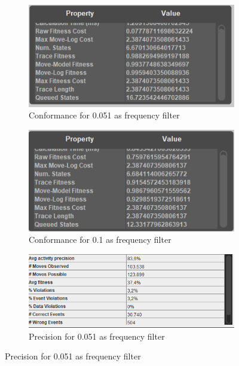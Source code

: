 \begin{figure}[!htbp]
\centering
\begin{subfigure}{.4\textwidth}
  \centering
  \includegraphics[width=\linewidth]{P_Conformance0-051.PNG}
  \caption{Conformance for 0.051 as frequency filter}
  \label{fig:P_Conf0-051}
\end{subfigure}%
\begin{subfigure}{.4\textwidth}
  \centering
  \includegraphics[width=\linewidth]{P_Conformance0-1.PNG}
  \caption{Conformance for 0.1 as frequency filter}
  \label{fig:P_Conf0-1}
\end{subfigure}
\begin{subfigure}{.4\textwidth}
  \centering
  \includegraphics[width=\linewidth]{P_Precision0-051.PNG}
  \caption{Precision for 0.051 as frequency filter}
  \label{fig:P_Prec0-051}

\end{subfigure}
\end{figure}

